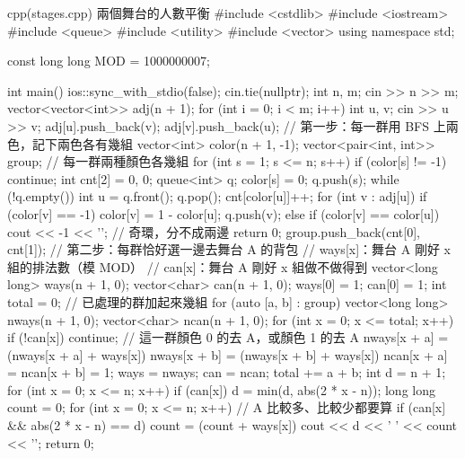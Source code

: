 \begin{example}[label=ex:cap-stages]{cpp}{(stages.cpp) 兩個舞台的人數平衡}
#include <cstdlib>
#include <iostream>
#include <queue>
#include <utility>
#include <vector>
using namespace std;

const long long MOD = 1000000007;

int main() {
    ios::sync_with_stdio(false);
    cin.tie(nullptr);
    int n, m;
    cin >> n >> m;
    vector<vector<int>> adj(n + 1);
    for (int i = 0; i < m; i++) {
        int u, v;
        cin >> u >> v;
        adj[u].push_back(v);
        adj[v].push_back(u);
    }
    // 第一步：每一群用 BFS 上兩色，記下兩色各有幾組
    vector<int> color(n + 1, -1);
    vector<pair<int, int>> group;     // 每一群兩種顏色各幾組
    for (int s = 1; s <= n; s++) {
        if (color[s] != -1) {
            continue;
        }
        int cnt[2] = {0, 0};
        queue<int> q;
        color[s] = 0;
        q.push(s);
        while (!q.empty()) {
            int u = q.front();
            q.pop();
            cnt[color[u]]++;
            for (int v : adj[u]) {
                if (color[v] == -1) {
                    color[v] = 1 - color[u];
                    q.push(v);
                } else if (color[v] == color[u]) {
                    cout << -1 << '\n';          // 奇環，分不成兩邊
                    return 0;
                }
            }
        }
        group.push_back({cnt[0], cnt[1]});
    }
    // 第二步：每群恰好選一邊去舞台 A 的背包
    // ways[x]：舞台 A 剛好 x 組的排法數（模 MOD）
    // can[x]：舞台 A 剛好 x 組做不做得到
    vector<long long> ways(n + 1, 0);
    vector<char> can(n + 1, 0);
    ways[0] = 1;
    can[0] = 1;
    int total = 0;                    // 已處理的群加起來幾組
    for (auto [a, b] : group) {
        vector<long long> nways(n + 1, 0);
        vector<char> ncan(n + 1, 0);
        for (int x = 0; x <= total; x++) {
            if (!can[x]) {
                continue;
            }
            // 這一群顏色 0 的去 A，或顏色 1 的去 A
            nways[x + a] = (nways[x + a] + ways[x]) %
            nways[x + b] = (nways[x + b] + ways[x]) %
            ncan[x + a] = ncan[x + b] = 1;
        }
        ways = nways;
        can = ncan;
        total += a + b;
    }
    int d = n + 1;
    for (int x = 0; x <= n; x++) {
        if (can[x]) {
            d = min(d, abs(2 * x - n));
        }
    }
    long long count = 0;
    for (int x = 0; x <= n; x++) {    // A 比較多、比較少都要算
        if (can[x] && abs(2 * x - n) == d) {
            count = (count + ways[x]) %
        }
    }
    cout << d << ' ' << count << '\n';
    return 0;
}
\end{example}

